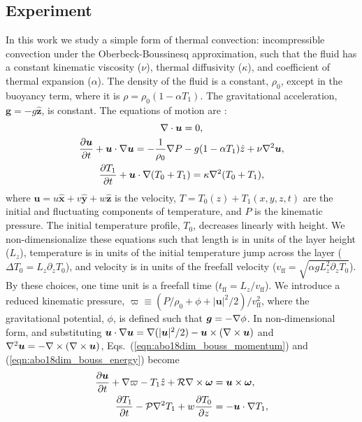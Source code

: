 \subsection{Experiment}
\label{sec:abo18_experiment}
In this work we study a simple form of thermal convection: incompressible \RB convection under the Oberbeck-Boussinesq approximation, such that the fluid has a constant kinematic viscosity ($\nu$), thermal diffusivity ($\kappa$), and coefficient of thermal expansion ($\alpha$). 
The density of the fluid is a constant, $\rho_0$, except in the buoyancy term, where it is $\rho = \rho_0(1  - \alpha T_1)$.
The gravitational acceleration, $\bm{g} = - g\bm{\hat{z}}$, is constant.
The equations of motion are \cite{spiegel&veronis1960}:
\begin{gather}
\nabla\cdot\bm{u} = 0, 
	\label{eqn:abo18incompressible}
\\
\frac{\partial \bm{u}}{\partial t} + \bm{u}\cdot\nabla\bm{u} =
-\frac{1}{\rho_0}\nabla P - g( 1 - \alpha T_1)\hat{z} + \nu\nabla^2\bm{u}, 
	\label{eqn:abo18dim_bouss_momentum}
\\
\frac{\partial T_1}{\partial t} + \bm{u}\cdot\nabla(T_0 + T_1) = \kappa\nabla^2 (T_0 + T_1),
	\label{eqn:abo18dim_bouss_energy}
\end{gather}
where $\bm{u} = u\bm{\hat{x}} + v\bm{\hat{y}} + w\bm{\hat{z}}$ is the velocity, $T = T_0(z) + T_1(x, y, z, t)$ are the initial and fluctuating components of temperature, and $P$ is the kinematic pressure. 
The initial temperature profile, $T_0$, decreases linearly with height.
We non-dimensionalize these equations such that length is in units of the layer height ($L_z$), temperature is in units of the initial temperature jump across the layer ($\Delta T_0 = L_z \partial_z T_0$), and velocity is in units of the freefall velocity ($v_{\text{ff}} = \sqrt{\alpha g L_z^2 \partial_z T_0}$).
By these choices, one time unit is a freefall time ($t_{\text{ff}} = L_z/v_{\text{ff}}$).
We introduce a reduced kinematic pressure, $\varpi \equiv (P / \rho_0 + \phi + |\bm{u}|^2 / 2) / v_{\text{ff}}^2$, where the gravitational potential, $\phi$, is defined such that $\bm{g} = -\nabla \phi$. 
In non-dimensional form, and substituting $\bm{u}\cdot\nabla\bm{u} = \nabla(|\bm{u}|^2/2) - \bm{u}\times(\nabla\times\bm{u})$ and $\nabla^2\bm{u} = -\nabla\times(\nabla\times\bm{u})$, Eqs.~(\ref{eqn:abo18dim_bouss_momentum}) and (\ref{eqn:abo18dim_bouss_energy}) become 
\begin{align}
\frac{\partial \bm{u}}{\partial t} + \nabla \varpi - T_1\hat{z} + \mathcal{R}\nabla\times\bm{\omega} &= \bm{u}\times\bm{\omega},
	\label{eqn:abo18bouss_momentum}
\\
\frac{\partial T_1}{\partial t} - \mathcal{P}\nabla^2 T_1 + w \frac{\partial T_0}{\partial z} &= - \bm{u}\cdot\nabla T_1,
	\label{eqn:abo18bouss_energy}
\end{align}
